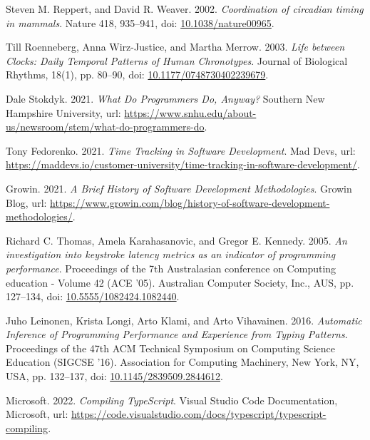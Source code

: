 \begin{thebibliography}{99}

 Steven M. Reppert, and David R. Weaver. 2002. \textit{Coordination of circadian timing in mammals}. Nature 418, 935–941, doi: \href{https://doi.org/10.1038/nature00965}{10.1038/nature00965}.

 Till Roenneberg, Anna Wirz-Justice, and Martha Merrow. 2003. \textit{Life between Clocks: Daily Temporal Patterns of Human Chronotypes}. Journal of Biological Rhythms, 18(1), pp. 80–90, doi: \href{https://doi.org/10.1177/0748730402239679}{10.1177/0748730402239679}.

 Dale Stokdyk. 2021. \textit{What Do Programmers Do, Anyway?} Southern New Hampshire University, url: \url{https://www.snhu.edu/about-us/newsroom/stem/what-do-programmers-do}.

 Tony Fedorenko. 2021. \textit{Time Tracking in Software Development}. Mad Devs, url: \url{https://maddevs.io/customer-university/time-tracking-in-software-development/}.

 Growin. 2021. \textit{A Brief History of Software Development Methodologies}. Growin Blog, url: \url{https://www.growin.com/blog/history-of-software-development-methodologies/}.

 Richard C. Thomas, Amela Karahasanovic, and Gregor E. Kennedy. 2005. \textit{An investigation into keystroke latency metrics as an indicator of programming performance}. Proceedings of the 7th Australasian conference on Computing education - Volume 42 (ACE '05). Australian Computer Society, Inc., AUS, pp. 127–134, doi: \href{https://dl.acm.org/doi/10.5555/1082424.1082440}{10.5555/1082424.1082440}.

 Juho Leinonen, Krista Longi, Arto Klami, and Arto Vihavainen. 2016. \textit{Automatic Inference of Programming Performance and Experience from Typing Patterns}. Proceedings of the 47th ACM Technical Symposium on Computing Science Education (SIGCSE '16). Association for Computing Machinery, New York, NY, USA, pp. 132–137, doi: \href{https://doi.org/10.1145/2839509.2844612}{10.1145/2839509.2844612}.

 Microsoft. 2022. \textit{Compiling TypeScript}. Visual Studio Code Documentation, Microsoft, url: \url{https://code.visualstudio.com/docs/typescript/typescript-compiling}.


\end{thebibliography}
